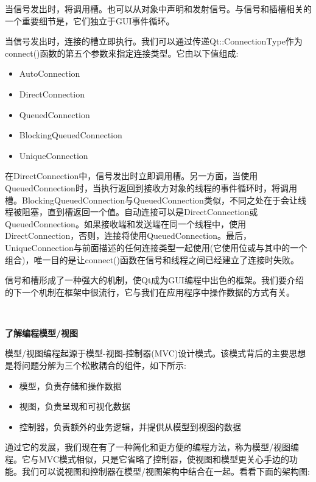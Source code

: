 当信号发出时，将调用槽。也可以从对象中声明和发射信号。与信号和插槽相关的一个重要细节是，它们独立于GUI事件循环。 \par
当信号发出时，连接的槽立即执行。我们可以通过传递Qt::ConnectionType作为connect()函数的第五个参数来指定连接类型。它由以下值组成: \par

\begin{itemize}
	\item AutoConnection
	\item DirectConnection
	\item QueuedConnection
	\item BlockingQueuedConnection
	\item UniqueConnection
\end{itemize}

在DirectConnection中，信号发出时立即调用槽。另一方面，当使用QueuedConnection时，当执行返回到接收方对象的线程的事件循环时，将调用槽。BlockingQueuedConnection与QueuedConnection类似，不同之处在于会让线程被阻塞，直到槽返回一个值。自动连接可以是DirectConnection或QueuedConnection。如果接收端和发送端在同一个线程中，使用DirectConnection，否则，连接将使用QueuedConnection。最后，UniqueConnection与前面描述的任何连接类型一起使用(它使用位或与其中的一个组合)，唯一目的是让connect()函数在信号和线程之间已经建立了连接时失败。 \par
信号和槽形成了一种强大的机制，使Qt成为GUI编程中出色的框架。我们要介绍的下一个机制在框架中很流行，它与我们在应用程序中操作数据的方式有关。 \par

\noindent\textbf{}\ \par
\textbf{了解编程模型/视图} \ \par
模型/视图编程起源于模型-视图-控制器(MVC)设计模式。该模式背后的主要思想是将问题分解为三个松散耦合的组件，如下所示: \par

\begin{itemize}
	\item 模型，负责存储和操作数据
	\item 视图，负责呈现和可视化数据
	\item 控制器，负责额外的业务逻辑，并提供从模型到视图的数据
\end{itemize}

通过它的发展，我们现在有了一种简化和更方便的编程方法，称为模型/视图编程。它与MVC模式相似，只是它省略了控制器，使视图和模型更关心手边的功能。我们可以说视图和控制器在模型/视图架构中结合在一起。看看下面的架构图: \par

